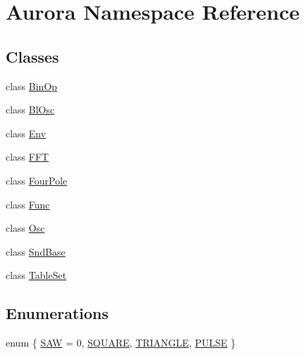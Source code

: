\hypertarget{namespace_aurora}{}\section{Aurora Namespace Reference}
\label{namespace_aurora}
\subsection*{Classes}
\begin{DoxyCompactItemize}
\item 
class \hyperlink{class_aurora_1_1_bin_op}{Bin\+Op}
\item 
class \hyperlink{class_aurora_1_1_bl_osc}{Bl\+Osc}
\item 
class \hyperlink{class_aurora_1_1_env}{Env}
\item 
class \hyperlink{class_aurora_1_1_f_f_t}{F\+FT}
\item 
class \hyperlink{class_aurora_1_1_four_pole}{Four\+Pole}
\item 
class \hyperlink{class_aurora_1_1_func}{Func}
\item 
class \hyperlink{class_aurora_1_1_osc}{Osc}
\item 
class \hyperlink{class_aurora_1_1_snd_base}{Snd\+Base}
\item 
class \hyperlink{class_aurora_1_1_table_set}{Table\+Set}
\end{DoxyCompactItemize}
\subsection*{Enumerations}
\begin{DoxyCompactItemize}
\item 
enum \{ \hyperlink{namespace_aurora_a890b8d3786c8a25750e8097adae3b513ad47a607309b6d737bba699a295e5e814}{S\+AW} = 0, 
\hyperlink{namespace_aurora_a890b8d3786c8a25750e8097adae3b513ad12f117b00f964cb4de3809ca2e2fa2b}{S\+Q\+U\+A\+RE}, 
\hyperlink{namespace_aurora_a890b8d3786c8a25750e8097adae3b513a0c9e1e4fb03cbc79bb5fdd9db743818f}{T\+R\+I\+A\+N\+G\+LE}, 
\hyperlink{namespace_aurora_a890b8d3786c8a25750e8097adae3b513aa52ebfb9f31c0d7f0da3f2f66b622928}{P\+U\+L\+SE}
 \}
\end{DoxyCompactItemize}
